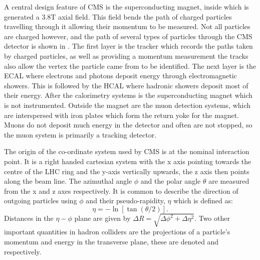 A central design feature of CMS is the superconducting magnet, inside which is generated a 3.8T axial field. This field bends the path of charged particles travelling through it allowing their momentum to be measured. Not all particles are charged however, and the path of several types of particles through the CMS detector is shown in . The first layer is the tracker which records the paths taken by charged particles, as well as providing a momentum measurement the tracks also allow the vertex the particle came from to be identified. The next layer is the \ac{ECAL} where electrons and photons deposit energy through electromagnetic showers. This is followed by the \ac{HCAL} where hadronic showers deposit most of their energy. After the calorimetry systems is the superconducting magnet which is not instrumented. Outside the magnet are the muon detection systems, which are interspersed with iron plates which form the return yoke for the magnet. Muons do not deposit much energy in the detector and often are not stopped, so the muon system is primarily a tracking detector.

The origin of the co-ordinate system used by CMS is at the nominal interaction point. It is a right handed cartesian system with the x axis pointing towards the centre of the LHC ring and the y-axis vertically upwards, the z axis then points along the beam line. The azimuthal angle $\phi$ and the polar angle $\theta$ are measured from the x and z axes respectively. It is common to describe the direction of outgoing particles using $\phi$ and their pseudo-rapidity, $\eta$ which is defined as:
\begin{equation}
  \label{eq:eta}
  \eta=-\ln[\tan(\theta/2)].
\end{equation}
Distances in the $\eta-\phi$ plane are given by $\Delta R=\sqrt{\Delta\phi^2+\Delta\eta^2}$. Two other important quantities in hadron colliders are the projections of a particle's momentum and energy in the transverse plane, these are denoted \pt and \Et respectively.

